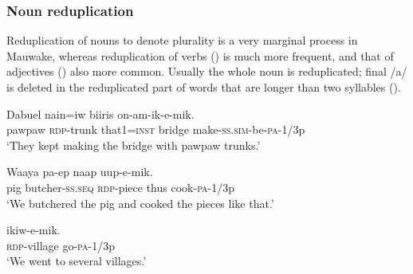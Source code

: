 
\subsubsection[Noun reduplication]{Noun reduplication}
{}
Reduplication of nouns to denote plurality is a very marginal process in Mauwake, whereas reduplication of verbs () is much more frequent, and that of adjectives () also more common. Usually the whole noun is reduplicated; final /a/ is deleted in the reduplicated part of words that are longer than two syllables (). 

\ea%
\label{ex:x68}
\gll Dabuel  nain=iw biiris on-am-ik-e-mik. \\
pawpaw \textsc{rdp}-trunk that1=\textsc{inst} bridge make-\textsc{ss}.\textsc{sim}-be-\textsc{pa}-1/3p\\
\glt`They kept making the bridge with pawpaw trunks.'
\z

\ea%
\label{ex:x69}
\gll Waaya pa-ep  naap uup-e-mik. \\
pig butcher-\textsc{ss}.\textsc{seq} \textsc{rdp}-piece thus cook-\textsc{pa}-1/3p\\
\glt`We butchered the pig and cooked the pieces like that.'
\z

\ea%
\label{ex:x426}
\gll {} ikiw-e-mik. \\
\textsc{rdp}-village go-\textsc{pa}-1/3p\\
\glt`We went to several villages.'
\z

